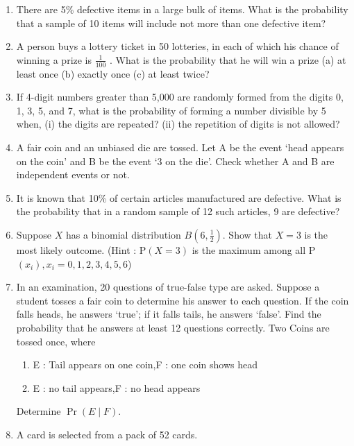 \providecommand{\pr}[1]{\ensuremath{\Pr\left(#1\right)}}
\providecommand{\brak}[1]{\ensuremath{\left(#1\right)}}
\begin{enumerate}[label=\thechapter.\arabic*,ref=\thechapter.\theenumi]
\item There are 5\% defective items in a large bulk of items. What is the probability
that a sample of 10 items will include not more than one defective item?
\item A person buys a lottery ticket in 50 lotteries, in each of which his chance of
winning a prize is $\frac{1}{100}$ . What is the probability that he will win a prize
(a) at least once (b) exactly once (c) at least twice?
\item If 4-digit numbers greater than 5,000 are randomly formed from the digits
0, 1, 3, 5, and 7, what is the probability of forming a number divisible by 5 when,
(i) the digits are repeated? (ii) the repetition of digits is not allowed?
\item A fair coin and an unbiased die are tossed. Let A be the event `head appears on the coin' and B be the event `3 on the die'. Check whether A and B are independent events or not.
\item It is known that 10\% of certain articles manufactured are defective. What is the probability that in a random sample of 12 such articles, 9 are defective?
\item Suppose $X$ has a binomial distribution $B\brak{6,\frac{1}{2}}$. Show that $X = 3$ is the most likely outcome. 
(Hint : P$\brak{X = 3}$ is the maximum among all P$\brak{x_i}, x_i = 0,1,2,3,4,5,6$)
\item In an examination, 20 questions of true-false type are asked. Suppose a student
	tosses a fair coin to determine his answer to each question. If the coin falls
	heads, he answers `true'; if it falls tails, he answers `false'. Find the probability
	that he answers at least 12 questions correctly.
Two Coins are tossed once, where
\begin{enumerate}
\item  E : Tail appears on one coin,\qquad F : one coin shows head
\item  E : no tail appears,\qquad\qquad\qquad F : no head appears
\end{enumerate}
Determine \pr{E\mid F}.
\item A card is selected from a pack of 52 cards.
\begin{enumerate}

\end{enumerate}
\end{enumerate}
